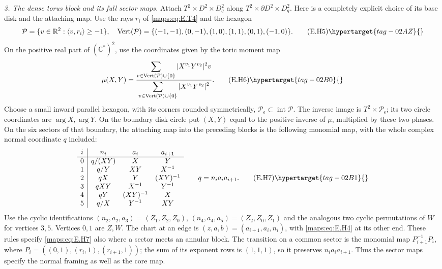 \begin{theorem}
\emph{3. The dense torus block and its full sector maps.}
Attach $T^2\times D^2\times D^2_q$ along
$T^2\times\partial D^2\times D^2_q$.  Here is a completely explicit
choice of its base disk and the attaching map.  Use the rays
$r_i$ of \eqref{maps:eq:E.T4} and the hexagon
\[
 \mathcal P=\{v\in\mathbb R^2:\langle v,r_i\rangle\geq-1\},
 \quad
 \operatorname{Vert}(\mathcal P)=
 \{(-1,-1),(0,-1),(1,0),(1,1),(0,1),(-1,0)\}.
 \tag{E.H5}\hypertarget{tag-02AZ}{}\label{maps:eq:E.H5}
\]
On the positive real part of $(\mathbb C^*)^2$, use the coordinates
given by the toric moment map
\[
 \mu(X,Y)=
 \frac{\displaystyle\sum_{v\in\operatorname{Vert}(\mathcal P)\cup\{0\}}
                 |X^{v_1}Y^{v_2}|^2v}
      {\displaystyle\sum_{v\in\operatorname{Vert}(\mathcal P)\cup\{0\}}
                 |X^{v_1}Y^{v_2}|^2}.
 \tag{E.H6}\hypertarget{tag-02B0}{}\label{maps:eq:E.H6}
\]
Choose a small inward parallel hexagon, with its corners rounded
symmetrically, $\mathcal P_\epsilon\subset\operatorname{int}\mathcal P$.
The inverse image is $T^2\times\mathcal P_\epsilon$; its two circle
coordinates are $\arg X,\arg Y$.  On the boundary disk circle put
$(X,Y)$ equal to the positive inverse of $\mu$, multiplied by these
two phases.  On the six sectors of that boundary, the attaching
map into the preceding blocks is the following monomial map, with
the whole complex normal coordinate $q$ included:
\[
\begin{array}{c|ccc}
 i& n_i&a_i&a_{i+1}\\ \hline
0&q/(XY)&X&Y\\
1&q/Y&XY&X^{-1}\\
2&qX&Y&(XY)^{-1}\\
3&qXY&X^{-1}&Y^{-1}\\
4&qY&(XY)^{-1}&X\\
5&q/X&Y^{-1}&XY
\end{array}
\qquad q=n_i a_i a_{i+1}.
\tag{E.H7}\hypertarget{tag-02B1}{}\label{maps:eq:E.H7}
\]
Use the cyclic identifications
$(n_2,a_2,a_3)=(Z_1,Z_2,Z_0)$,
$(n_4,a_4,a_5)=(Z_2,Z_0,Z_1)$ and the analogous two cyclic
permutations of $W$ for vertices $3,5$.  Vertices $0,1$ are $Z,W$.
The chart at an edge is $(z,a,b)=(a_{i+1},a_i,n_i)$, with \eqref{maps:eq:E.H4}
at its other end.  These rules specify \eqref{maps:eq:E.H7} also where a sector
meets an annular block.  The transition on a common sector is the
monomial map $P_{i+1}^{-1}P_i$, where
$P_i=((0,1),(r_i,1),(r_{i+1},1))$; the sum of its exponent rows
is $(1,1,1)$, so it preserves $n_i a_i a_{i+1}$.  Thus the sector maps specify the
normal framing as well as the core map.  


\end{theorem}
